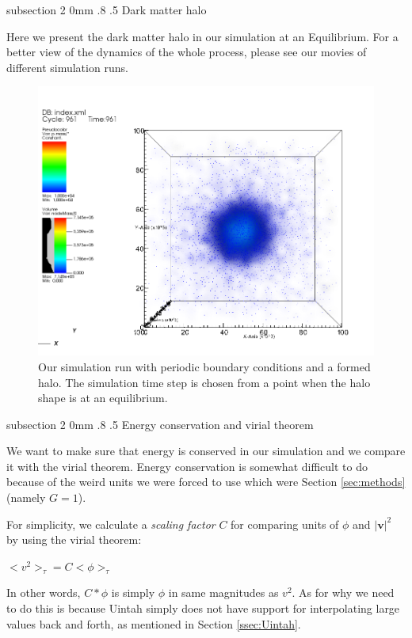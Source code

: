 \documentclass[notitlepage, 12pt]{article}
\makeatletter
\renewcommand{\subsection}{\@startsection    %
        {subsection}
        {2}
        {0mm}
        {.8\baselineskip}
        {.5\baselineskip}
        {\bfseries\normalsize}}
\makeatother
\begin{document}
\subsection{Dark matter halo}

Here we present the dark matter halo in our simulation at an Equilibrium. For a better view of the dynamics of the whole process, please see our 
movies of different simulation runs.

\begin{figure}[H]
\centering
\includegraphics[width=.8\textwidth]{dm_halo.png}
\caption{Our simulation run with periodic boundary conditions and a formed halo. The simulation time step is chosen from a point when the halo shape 
is at an equilibrium.}
\label{fig:dm_halo}
\end{figure}

\subsection{Energy conservation and virial theorem}

We want to make sure that energy is conserved in our simulation and we compare it with the virial theorem. Energy conservation is somewhat difficult to do because 
of the weird units we were forced to use which were Section \ref{sec:methods} (namely $G=1$).

For simplicity, we calculate a \emph{scaling factor} $C$ for comparing units of $\phi$ and $|\mathbf{v}|^2$ by using the virial theorem:

$<v^2>_\tau = C <\phi>_\tau$

In other words, $C * \phi$ is simply $\phi$ in same magnitudes as $v^2$. As for why we need to do this is because Uintah simply does not have support for 
interpolating large values back and forth, as mentioned in Section \ref{ssec:Uintah}.
\end{document}
